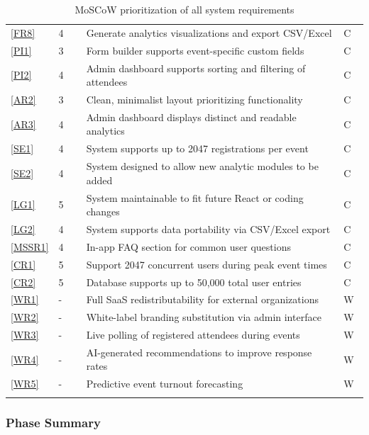 \documentclass[12pt]{article}
\begin{document}
{\begin{longtable}[H]{p{0.1\linewidth}p{0.08\linewidth}p{0.75\linewidth}p{0.07\linewidth}}
  \ref{FR8}   & 4 & Generate analytics visualizations and export CSV/Excel        & C \\
  \ref{PI1}   & 3 & Form builder supports event-specific custom fields            & C \\
  \ref{PI2}   & 4 & Admin dashboard supports sorting and filtering of attendees   & C \\
  \ref{AR2}   & 3 & Clean, minimalist layout prioritizing functionality           & C \\
  \ref{AR3}   & 4 & Admin dashboard displays distinct and readable analytics      & C \\
  \ref{SE1}   & 4 & System supports up to 2047 registrations per event            & C \\
  \ref{SE2}   & 4 & System designed to allow new analytic modules to be added    & C \\
  \ref{LG1}   & 5 & System maintainable to fit future React or coding changes     & C \\
  \ref{LG2}   & 4 & System supports data portability via CSV/Excel export         & C \\
  \ref{MSSR1} & 4 & In-app FAQ section for common user questions                  & C \\
  \ref{CR1}   & 5 & Support 2047 concurrent users during peak event times         & C \\
  \ref{CR2}   & 5 & Database supports up to 50,000 total user entries             & C \\
  \ref{WR1}   & - & Full SaaS redistributability for external organizations      & W \\
  \ref{WR2}   & - & White-label branding substitution via admin interface        & W \\
  \ref{WR3}   & - & Live polling of registered attendees during events           & W \\
  \ref{WR4}   & - & AI-generated recommendations to improve response rates       & W \\
  \ref{WR5}   & - & Predictive event turnout forecasting                         & W \\
  \bottomrule
  \caption{MoSCoW prioritization of all system requirements}\label{tab:moscow}
\end{longtable}
}

\subsubsection*{Phase Summary}
\end{document}
